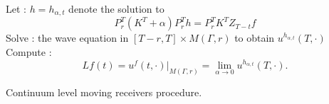\documentclass[final,leqno]{siamart1116}
\begin{document}
\begin{algorithm}
  \begin{algorithmic}
    \STATE Let : $h = h_{\alpha,t}$ denote the solution to 
    \begin{equation*}
      P_r^T(K^T + \alpha) P_r^T h = P_r^T K^T Z_{T - t}f
    \end{equation*}
    \STATE Solve : the wave equation in $[T-r, T] \times M(\Gamma,r)$
    to obtain $u^{h_{\alpha,t}}(T,\cdot)$
    \ENDFOR
    \STATE Compute : 
    \begin{equation*}
      Lf(t) = u^f(t,\cdot)|_{M(\Gamma,r)} = \lim_{\alpha \rightarrow 0} u^{h_{\alpha,t}}(T,\cdot).
    \end{equation*}
    \ENDFOR
    \ENDFOR
  \end{algorithmic}
  \caption{
    \label{algo:movingReceivers}
    Continuum level moving receivers procedure.}
\end{algorithm}
\end{document}
